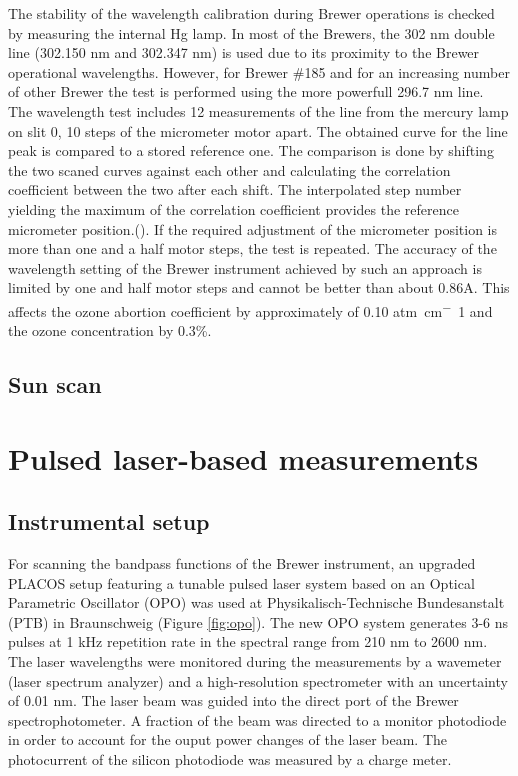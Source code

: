 \documentclass[acp, manuscript]{copernicus}
\begin{document}
   The stability of the wavelength calibration during Brewer operations is checked by measuring the internal Hg lamp. In most of the Brewers, the 302 \unit{nm} double line (302.150 nm and 302.347 nm) is used due to its proximity to the Brewer operational wavelengths. However, for Brewer \#185 and for an increasing number of other Brewer the test is  performed using the more powerfull 296.7 \unit{nm} line. The wavelength test includes 12 measurements of the line from the mercury lamp on slit 0, 10 steps of the micrometer motor apart. The obtained curve for the line peak is compared to a stored reference one. The comparison is done by shifting the two scaned curves against each other and calculating the correlation coefficient between the two after each shift. The interpolated step number yielding the maximum of the correlation coefficient provides the reference micrometer position.(\citep{savastiouk2005improvements}). If the required adjustment of the micrometer position is more than one and a half motor steps, the test is repeated. The accuracy of the wavelength setting of the Brewer instrument achieved by such an approach is limited by one and half motor steps and cannot be better than about 0.86A. This affects the ozone abortion coefficient by approximately of 0.10 \unit{atm cm^-1} and the ozone concentration by 0.3\%.
  


\subsection{Sun scan}
\citet{savastiouk2005improvements} 


\section{ Pulsed laser-based measurements}

\subsection{Instrumental setup}

For scanning the bandpass functions of the Brewer instrument, an upgraded PLACOS setup \citet{Nevas2009} featuring a tunable pulsed laser system based on an Optical Parametric Oscillator (OPO) was used at Physikalisch-Technische Bundesanstalt (PTB) in Braunschweig  (Figure \ref{fig:opo}). The new OPO system generates 3-6 ns pulses at 1 kHz repetition rate in the spectral range from 210 \unit{nm} to 2600 \unit{nm}. The laser wavelengths were monitored during the measurements by a wavemeter (laser spectrum analyzer) and a high-resolution spectrometer with an uncertainty of 0.01 nm. The laser beam was guided into the direct port of the Brewer spectrophotometer. A fraction of the beam was directed to a monitor photodiode in order to account for the ouput power changes of the laser beam. The photocurrent of the silicon photodiode was measured by a charge meter.
\end{document}
